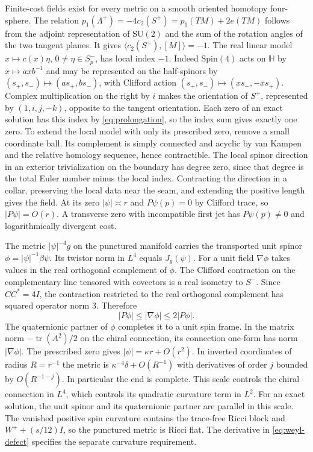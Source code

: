 \documentclass[11pt]{article}
\numberwithin{equation}{section}
\DeclareMathOperator{\tr}{tr}
\newcommand{\abs}[1]{\lvert #1\rvert}
\begin{document}
Finite-cost fields exist for every metric on a smooth oriented homotopy
four-sphere. The relation
\(p_1(\Lambda^+)=-4c_2(S^+)=p_1(TM)+2e(TM)\)
follows from the adjoint representation of \(\mathrm{SU}(2)\) and
the sum of the rotation angles of the two tangent planes. It gives
\(\langle c_2(S^+),[M]\rangle=-1\). The real linear model
\(x\mapsto c(x)\eta\), \(0\ne\eta\in S^-_p\), has local index \(-1\).
Indeed \(\mathrm{Spin}(4)\) acts on \(\mathbb H\) by
\(x\mapsto a x b^{-1}\) and may be represented on the half-spinors by
\((s_+,s_-)\mapsto(a s_+,b s_-)\), with Clifford action
\((s_+,s_-)\mapsto(x s_-,-\bar x s_+)\). Complex multiplication on
the right by \(i\) makes the orientation of \(S^+\), represented
by \((1,i,j,-k)\), opposite to the tangent orientation.
Each zero of an exact solution has this index by
\eqref{eq:prolongation}, so the index sum gives exactly one zero.
To extend the local model with only its prescribed zero, remove
a small coordinate ball. Its complement is simply connected and
acyclic by van Kampen and the relative homology sequence, hence
contractible. The local spinor direction in an exterior
trivialization on the boundary has degree zero, since that degree
is the total Euler number minus the local index. Contracting the
direction in a collar, preserving the local data near the seam,
and extending the positive length gives the field. At its zero
\(\abs{\psi}\asymp r\) and \(P\psi(p)=0\) by Clifford trace, so
\(\abs{P\psi}=O(r)\). A transverse zero with incompatible first
jet has \(P\psi(p)\ne0\) and logarithmically divergent cost.

The metric \(\abs{\psi}^{-4}g\) on the punctured manifold carries
the transported unit spinor \(\phi=\abs{\psi}^{-1}\beta\psi\).
Its twistor norm in \(L^4\) equals \(J_g(\psi)\).
For a unit field \(\nabla\phi\) takes values in the real orthogonal
complement of \(\phi\). The Clifford contraction on the complementary
line tensored with covectors is a real isometry to \(S^-\).
Since \(CC^*=4I\), the contraction restricted to the real orthogonal
complement has squared operator norm \(3\). Therefore
\[
 \abs{P\phi}\le\abs{\nabla\phi}\le2\abs{P\phi}.
\]
The quaternionic partner of \(\phi\) completes it to a unit spin
frame. In the matrix norm \(-\tr(A^2)/2\) on the chiral connection,
its connection one-form has norm \(\abs{\nabla\phi}\).
The prescribed zero gives \(\abs{\psi}=\kappa r+O(r^2)\).
In inverted coordinates of radius \(R=r^{-1}\) the metric is
\(\kappa^{-4}\delta+O(R^{-1})\) with derivatives of order \(j\)
bounded by \(O(R^{-1-j})\). In particular the end is complete.
This scale controls the chiral connection in \(L^4\), which controls
its quadratic curvature term in \(L^2\). For an exact solution,
the unit spinor and its quaternionic partner are parallel in this
scale. The vanished positive spin curvature contains the trace-free
Ricci block and \(W^++(s/12)I\), so the punctured metric is Ricci flat.
The derivative in
\eqref{eq:weyl-defect} specifies the separate curvature requirement.
\end{document}
